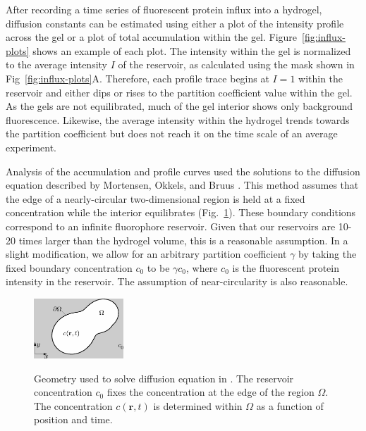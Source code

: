 After recording a time series of fluorescent protein influx into a hydrogel, diffusion constants can be estimated using either a plot of the intensity profile across the gel or a plot of total accumulation within the gel.  Figure~\ref{fig:influx-plots} shows an example of each plot.  The intensity within the gel is normalized to the average intensity $I$ of the reservoir, as calculated using the mask shown in Fig~\ref{fig:influx-plots}A.  Therefore, each profile trace begins at $I=1$ within the reservoir and either dips or rises to the partition coefficient value within the gel.  As the gels are not equilibrated, much of the gel interior shows only background fluorescence.  Likewise, the average intensity within the hydrogel trends towards the partition coefficient but does not reach it on the time scale of an average experiment.

Analysis of the accumulation and profile curves used the solutions to the diffusion equation described by Mortensen, Okkels, and Bruus \cite{mortensen06}.  This method assumes that the edge of  a nearly-circular two-dimensional region is held at a fixed concentration while the interior equilibrates (Fig.~\ref{fig:mortensen}).  These boundary conditions correspond to an infinite fluorophore reservoir.  Given that our reservoirs are 10-20 times larger than the hydrogel volume, this is a reasonable assumption.  In a slight modification, we allow for an arbitrary partition coefficient $\gamma$ by taking the fixed boundary concentration $c_0$ to be $\gamma c_0$, where $c_0$ is the fluorescent protein intensity in the reservoir.  The assumption of near-circularity is also reasonable.

\begin{figure}
\caption[Geometry of profile and accumulation model.]{Geometry used to solve diffusion equation in \cite{mortensen06}.  The reservoir concentration $c_0$ fixes the concentration at the edge of the region $\Omega$.  The concentration $c(\mathbf{r},t)$ is determined within $\Omega$ as a function of position and time.}
\centering
\includegraphics[width=0.3\textwidth]{figs/ch04/mortensen}
\label{fig:mortensen}
\end{figure}

